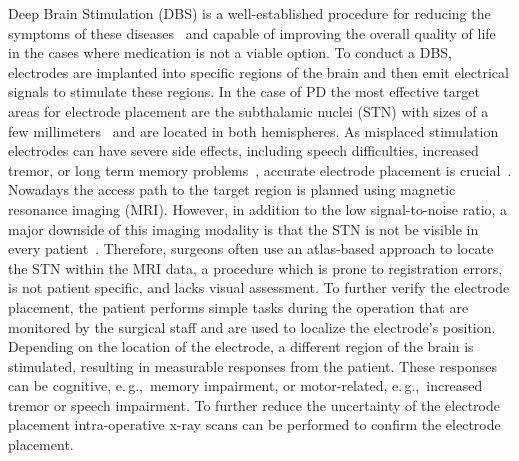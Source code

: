\documentclass{vgtc}                          %
\begin{document}
Deep Brain Stimulation (DBS) is a well-established procedure for reducing the symptoms of these diseases~\cite{Lindberg2002,Benabid2009} and capable of improving the overall quality of life in the cases where medication is not a viable option. To conduct a DBS, electrodes are implanted into specific regions of the brain and then emit electrical signals to stimulate these regions. In the case of PD the most effective target areas for electrode placement are the subthalamic nuclei (STN) with sizes of a few millimeters~\cite{Richter2004} and are located in both hemispheres. As misplaced stimulation electrodes can have severe side effects, including speech difficulties, increased tremor, or long term memory problems~\cite{Astrom2010}, accurate electrode placement is crucial~\cite{Rodriguez-Oroz2005}. Nowadays the access path to the target region is planned using magnetic resonance imaging (MRI). However, in addition to the low signal-to-noise ratio, a major downside of this imaging modality is that the STN is not be visible in every patient~\cite{Starr2002}. Therefore, surgeons often use an atlas-based approach to locate the STN within the MRI data, a procedure which is prone to registration errors, is not patient specific, and lacks visual assessment. To further verify the electrode placement, the patient performs simple tasks during the operation that are monitored by the surgical staff and are used to localize the electrode's position. Depending on the location of the electrode, a different region of the brain is stimulated, resulting in measurable responses from the patient. These responses can be cognitive, e.\,g.,~memory impairment, or motor-related, e.\,g.,~increased tremor or speech impairment. To further reduce the uncertainty of the electrode placement intra-operative x-ray scans can be performed to confirm the electrode placement.
%
%
\end{document}
